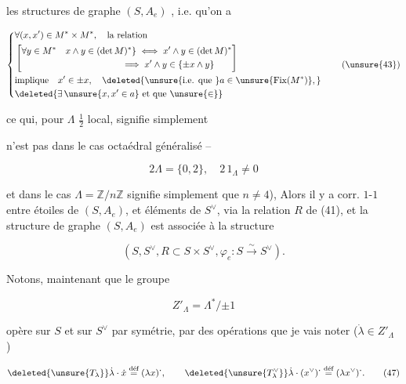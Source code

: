 
  les structures de graphe $(S,A_e)$ , i.e. qu'on a

\[
\left\{\begin{aligned}
&\forall(x,x')\in M^*\times M^*,\quad\text{la relation}\\
&\left[\begin{aligned}
&\forall y\in M^*\quad x\wedge y\in(\det M)^*\} \iff x'\wedge y\in(\det M)^*\\
&\hspace{38mm}\implies x'\wedge y\in\{\pm x\wedge y\}
\end{aligned}\right]\\
&\text{implique}\quad x'\in\pm x,\quad\deleted{\text{\unsure{i.e. que }} a\in\unsure{\mathrm{Fix}(M^*)},}\\
&\deleted{\exists\,\unsure{x,x'\in a}\ \text{et que }\unsure{\in}}
\end{aligned}\right. \tag*{(\unsure{43})}
\]

ce qui, pour $\Lambda$ $\frac12$ local, signifie simplement 

n'est pas dans le cas octaédral généralisé --

\[
2\Lambda=\{0,2\},\quad 2\,1_\Lambda\ne0 \tag*{(44)}
\]

et dans le cas $\Lambda=\mathbb Z/n\mathbb Z$ signifie simplement que $n\ne4$), Alors il y a corr. $1$-$1$ entre étoiles de $(S,A_e)$, et éléments de $S^\vee$, via la relation $R$ de (41), et la structure de graphe $(S,A_e)$ est associée à la structure

\[
(S,S^\vee,R\subset S\times S^\vee,\varphi_e:S\xrightarrow{\sim}S^\vee). \tag*{(45)}
\]

Notons, maintenant que le groupe

\[
Z'_\Lambda=\Lambda^*/{\pm1} \tag*{(46)}
\]

opère sur $S$ et sur $S^\vee$ par symétrie,  par des opérations que je vais noter   ($\dot\lambda\in Z'_\Lambda$ )

\[
\deleted{\unsure{T_\lambda}}\dot\lambda\cdot\dot x\overset{\text{déf}}=(\lambda x)^{\boldsymbol\cdot},\qquad
\deleted{\unsure{T^\vee_\lambda}}\dot\lambda\cdot(x^\vee)^{\boldsymbol\cdot}\overset{\text{déf}}=(\lambda x^\vee)^{\boldsymbol\cdot}. \tag*{(47)}
\]

